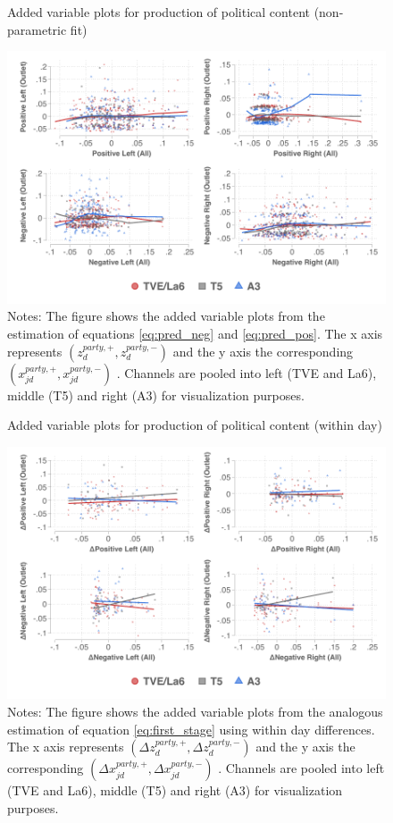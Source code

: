 \documentclass[12pt]{article}
\begin{document}
	
		\begin{figure}[h!]
		\centering
		\caption{Added variable plots for production of political content (non-parametric fit)}
		\includegraphics[width=150mm]{figures/fwl_plots_lowess}
		\caption*{\small Notes: The figure shows the added variable plots from the estimation of equations   \ref{eq:pred_neg} and \ref{eq:pred_pos}. The x axis represents $(z_d^{party,+},z_d^{party,-}) $ and the y axis the corresponding  $(x_{jd}^{party,+},x_{jd}^{party,-}) $   . Channels are pooled into left (TVE and La6), middle (T5) and right (A3) for visualization purposes.  }
		\label{fig:fwl_lowess}
	\end{figure}
	

	
	\begin{figure}[h!]
		\centering
		\caption{Added variable plots for production of political content (within day)}
		\includegraphics[width=160mm]{figures/fwl_plots_lowess_diff_costs}
		\caption*{\small Notes: The figure shows the added variable plots from the analogous estimation of equation \ref{eq:first_stage} using within day differences. The x axis represents $\left(\Delta z_d^{party,+},\Delta z_d^{party,-}\right) $ and the y axis the corresponding  $\left(\Delta x_{jd}^{party,+},\Delta x_{jd}^{party,-}\right) $   . Channels are pooled into left (TVE and La6), middle (T5) and right (A3) for visualization purposes.  }
		\label{fig:fwl_diff}
	\end{figure}
	
\end{document}
